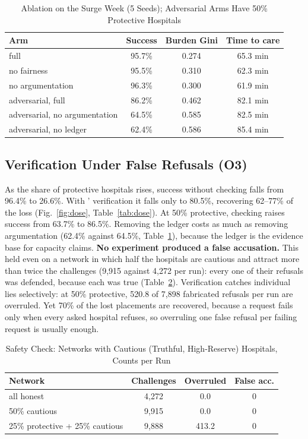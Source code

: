 \begin{table}[!t]
\centering
\caption{Ablation on the Surge Week (5 Seeds); Adversarial Arms Have 50\% Protective Hospitals}
\label{tab:ablation}
\scriptsize
\setlength{\tabcolsep}{4pt}
\begin{tabular}{@{}lccc@{}}
\toprule
Arm & Success & Burden Gini & Time to care \\
\midrule
full                          & 95.7\% & 0.274 & 65.3 min \\
no fairness                   & 95.5\% & 0.310 & 62.3 min \\
no argumentation              & 96.3\% & 0.300 & 61.9 min \\
\midrule
adversarial, full             & 86.2\% & 0.462 & 82.1 min \\
adversarial, no argumentation & 64.5\% & 0.585 & 82.5 min \\
adversarial, no ledger        & 62.4\% & 0.586 & 85.4 min \\
\bottomrule
\end{tabular}
\end{table}

\subsection{Verification Under False Refusals (O3)}
\label{sec:res-adversarial}
As the share of protective hospitals rises, success without checking falls from 96.4\% to 26.6\%. With \mahros{}' verification it falls only to 80.5\%, recovering 62--77\% of the loss (Fig.~\ref{fig:dose}, Table~\ref{tab:dose}). At 50\% protective, checking raises success from 63.7\% to 86.5\%. Removing the ledger costs as much as removing argumentation (62.4\% against 64.5\%, Table~\ref{tab:ablation}), because the ledger is the evidence base for capacity claims. \textbf{No experiment produced a false accusation.} This held even on a network in which half the hospitals are cautious and attract more than twice the challenges (9,915 against 4,272 per run): every one of their refusals was defended, because each was true (Table~\ref{tab:safety}). Verification catches individual lies selectively: at 50\% protective, 520.8 of 7,898 fabricated refusals per run are overruled. Yet 70\% of the lost placements are recovered, because a request fails only when every asked hospital refuses, so overruling one false refusal per failing request is usually enough.

\begin{table}[!t]
\centering
\caption{Safety Check: Networks with Cautious (Truthful, High-Reserve) Hospitals, Counts per Run}
\label{tab:safety}
\scriptsize
\begin{tabular}{@{}lccc@{}}
\toprule
Network & Challenges & Overruled & False acc. \\
\midrule
all honest & 4,272 & 0.0 & 0 \\
50\% cautious & 9,915 & 0.0 & 0 \\
25\% protective + 25\% cautious & 9,888 & 413.2 & 0 \\
\bottomrule
\end{tabular}
\end{table}

